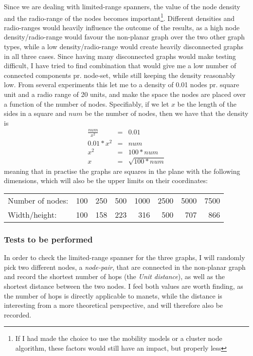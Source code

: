 Since we are dealing with limited-range spanners, the value of the node density and the radio-range of the nodes becomes important\footnote{If I had made the choice to use the mobility models or a cluster node algorithm, these factors would still have an impact, but properly less}. Different densities and radio-ranges would heavily influence the outcome of the results, as a high node density/radio-range would favour the non-planar graph over the two other graph types, while a low density/radio-range would create heavily disconnected graphs in all three cases. Since having many disconnected graphs would make testing difficult, I have tried to find combination that would give me a low number of connected components pr. node-set, while still keeping the density reasonably low. From several experiments this let me to a density of 0.01 nodes pr. square unit and a radio range of 20 units, and make the space the nodes are placed over a function of the number of nodes. Specifiably, if we let $x$ be the length of the sides in a square and $num$ be the number of nodes, then we have that the density is
\begin{eqnarray}
\frac{num}{x^2} &=& 0.01 \\
0.01 * x^2 &=& num \\
x^2 &=& 100 * num\\
x &=& \sqrt{100 * num}  
\end{eqnarray}
meaning that in practise the graphs are squares in the plane with the following dimensions, which will also be the upper limits on their coordinates:

\begin{tabular}{lrrrrrrr}
Number of nodes: & 100 & 250 & 500 & 1000 & 2500 & 5000 & 7500 \\
Width/height:    & 100 & 158 & 223 &  316 &  500 &  707 &  866  
\end{tabular} 

\subsubsection{Tests to be performed}
\label{section:spanner_tests_performed}
In order to check the limited-range spanner for the three graphs, I will randomly pick two different nodes, a \emph{node-pair}, that are connected in the non-planar graph and record the shortest number of hops (the \emph{Unit distance}), as well as the shortest distance between the two nodes. I feel both values are worth finding, as the number of hops is directly applicable to \acp{manet}, while the distance is interesting from a more theoretical perspective, and will therefore also be recorded.


